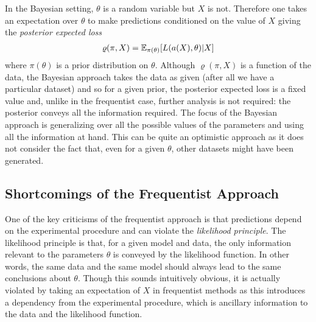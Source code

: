 In the Bayesian setting, $\theta$ is a random variable but $X$ is not.  Therefore one takes an expectation over $\theta$
to make predictions conditioned on the value of $X$ giving the \emph{posterior expected loss}~\cite{robert2007bayesian}
\begin{align}
\label{eq:bayes:bayes-est}
\varrho(\pi,X) = \mathbb{E}_{\pi(\theta)} [L(a(X),\theta) | X]
\end{align}
where $\pi(\theta)$ is a prior distribution on $\theta$.  Although $\varrho(\pi,X)$ is a function of the data, the Bayesian
approach takes the data as given (after all we have a particular dataset) and so for a given prior, the posterior
expected loss is a fixed value and, unlike in the frequentist case, further analysis is not required: the posterior
conveys all the information required.  The focus of the Bayesian approach is generalizing over all the possible values of
the parameters and using all the information at hand.  
This can be quite an optimistic approach as it does not consider the fact that, even for a given $\theta$,
other datasets might have been generated.  

\subsection{Shortcomings of the Frequentist Approach}
\label{sec:bayes:religion:freq}

One of the key criticisms of the frequentist approach is that predictions depend on the experimental procedure and
can violate the \emph{likelihood principle}.  The likelihood principle is that, for a given model and data, the only information relevant
to the parameters $\theta$ is conveyed by the likelihood function.  In other words, the same data and the same model should
always lead to the same conclusions about $\theta$.  Though this sounds intuitively obvious, it is actually violated by
taking an expectation of $X$ in frequentist methods as this introduces a dependency from the experimental procedure, which
is ancillary information to the data and the likelihood function.  

